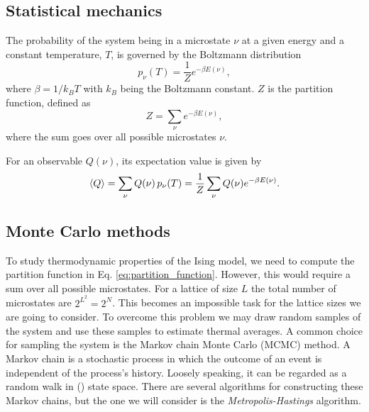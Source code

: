 \subsection{Statistical mechanics}\label{subsec_theory:statistical_mechanics}

The probability of the system being in a microstate $\nu$ at a given energy and a constant temperature, $T$, is governed by the Boltzmann distribution
\begin{equation}\label{eq:boltzmann_distr}
    p_\nu (T) = \frac{1}{Z}e^{-\beta E(\nu)},
\end{equation} 
where $\beta=1/k_B T$ with $k_B$ being the Boltzmann constant. $Z$ is the partition function, defined as 
\begin{equation}\label{eq:partition_function}
    Z = \sum_\nu e^{-\beta E(\nu)},
\end{equation}  
where the sum goes over all possible microstates $\nu$. 

For an observable $Q(\nu)$, its expectation value is given by 
\begin{equation}\label{eq:observable_exp_val}
    \expval{Q} = \sum_{\nu} Q(\nu)\, p_\nu(T) = \frac{1}{Z} \sum_\nu Q(\nu) e^{-\beta E(\nu)}.
\end{equation}



\subsection{Monte Carlo methods} \label{subsec_theory:MC_methods}

To study thermodynamic properties of the Ising model, we need to compute the partition function in Eq. \eqref{eq:partition_function}. However, this would require a sum over all possible microstates. For a lattice of size $L$ the total number of  microstates are $2^{L^2}=2^N$. This becomes an impossible task for the lattice sizes we are going to consider. To overcome this problem we may draw random samples of the system and use these samples to estimate thermal averages. A common choice for sampling the system is the Markov chain Monte Carlo (MCMC) method. A Markov chain is a stochastic process in which the outcome of an event is independent of the process's history. Loosely speaking, it can be regarded as a random walk in () state space. There are several algorithms for constructing these Markov chains, but the one we will consider is the \textit{Metropolis-Hastings} algorithm. 

